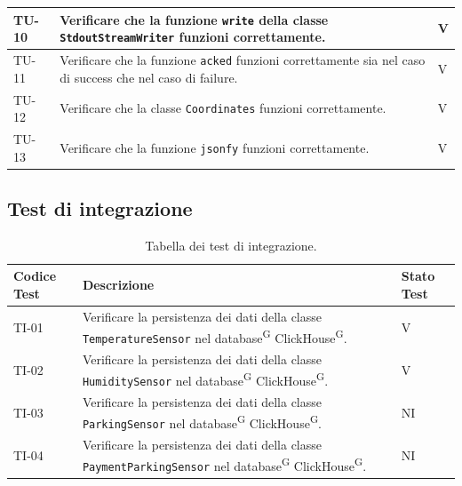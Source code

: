 \documentclass[8pt]{article}
\newcommand{\glossterm}[1]{#1\textsuperscript{G}} %
\begin{document}
\begin{longtable}{|>{\centering}p{2cm}|>{\RaggedRight}m{12cm}|>{\centering\arraybackslash}p{2cm}|}
    TU-10 & Verificare che la funzione \verb|write| della classe
    \verb|StdoutStreamWriter| funzioni correttamente. & V \\
    \hline

    TU-11 & Verificare che la funzione \verb|acked| funzioni correttamente sia nel caso di success che nel caso di failure. & V \\
    \hline

    TU-12 & Verificare che la classe \verb|Coordinates| funzioni correttamente. & V \\
    \hline

    TU-13 & Verificare che la funzione \verb|jsonfy| funzioni correttamente. & V \\
    \hline

\end{longtable}
\clearpage
\subsection{Test di integrazione}
\renewcommand{\arraystretch}{2.5}
\begin{longtable}{|>{\centering}p{2cm}|>{\RaggedRight}m{12cm}|>{\centering\arraybackslash}p{2cm}|}
    \hline
    \rowcolor{white}
    \textbf{Codice Test} & \textbf{Descrizione} & \textbf{Stato Test} \\
    \hline
    \endfirsthead 
    \rowcolor{white}
    \caption{Tabella dei test di integrazione.} 
    \label{table:Tabella dei test di integrazione}
    \endlastfoot 
        
        TI-01 & Verificare la persistenza dei dati della classe \verb|TemperatureSensor| nel \glossterm{database} \glossterm{ClickHouse}.  & V \\
        \hline
    
        TI-02 & Verificare la persistenza dei dati della classe \verb|HumiditySensor| nel \glossterm{database} \glossterm{ClickHouse}.  & V \\
        \hline

		TI-03 & Verificare la persistenza dei dati della classe \verb|ParkingSensor| nel \glossterm{database} \glossterm{ClickHouse}. & NI \\
		\hline 
		TI-04 & Verificare la persistenza dei dati della classe \verb|PaymentParkingSensor| nel \glossterm{database} \glossterm{ClickHouse}. & NI \\
    \hline
\end{longtable}
\end{document}
